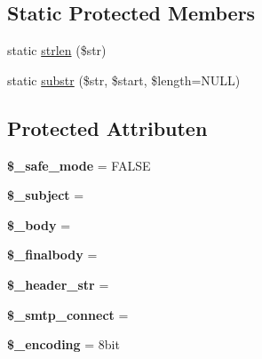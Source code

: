 \subsection*{Static Protected Members}
\begin{DoxyCompactItemize}
\item 
static \mbox{\hyperlink{class_c_i___email_a4c29a687d4ed62c26a10e41d98930d5f}{strlen}} (\$str)
\item 
static \mbox{\hyperlink{class_c_i___email_a101caef57ef0b165da5747e2c2e6c9dc}{substr}} (\$str, \$start, \$length=N\+U\+LL)
\end{DoxyCompactItemize}
\subsection*{Protected Attributen}
\begin{DoxyCompactItemize}
\item 
\mbox{\label{class_c_i___email_a9f2bbbf11ed324c1744f64d81242e8d5}} 
{\bfseries \$\+\_\+safe\+\_\+mode} = F\+A\+L\+SE
\item 
\mbox{\label{class_c_i___email_a3a212566602bb9c1c34e7619390b1bb8}} 
{\bfseries \$\+\_\+subject} = \textquotesingle{}\textquotesingle{}
\item 
\mbox{\label{class_c_i___email_a2428d6733045fa7c07e5f61c8c85b8c9}} 
{\bfseries \$\+\_\+body} = \textquotesingle{}\textquotesingle{}
\item 
\mbox{\label{class_c_i___email_afe3b263ee6d58805f3c06ef1fdc863a5}} 
{\bfseries \$\+\_\+finalbody} = \textquotesingle{}\textquotesingle{}
\item 
\mbox{\label{class_c_i___email_a551b64b005666b98b001ed7ff405047c}} 
{\bfseries \$\+\_\+header\+\_\+str} = \textquotesingle{}\textquotesingle{}
\item 
\mbox{\label{class_c_i___email_ab15af26ecd0970be1fb7609d06eec5ba}} 
{\bfseries \$\+\_\+smtp\+\_\+connect} = \textquotesingle{}\textquotesingle{}
\item 
\mbox{\label{class_c_i___email_a37d569dfb47810a72ca1cfc5095ad149}} 
{\bfseries \$\+\_\+encoding} = \textquotesingle{}8bit\textquotesingle{}

\end{DoxyCompactItemize}
